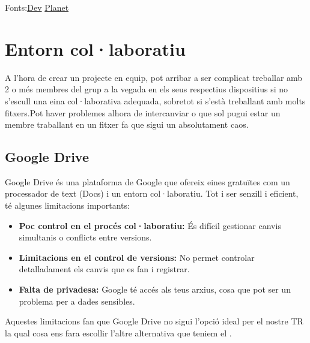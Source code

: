 Fonts:\href{https://dev.to/xploitcore/kde-vs-gnome-vs-others-choosing-the-best-linux-desktop-environment-in-2025-ab5}{Dev} \href{https://planet.communia.org/index.php/en/node/77}{Planet}



\section{Entorn col·laboratiu}\label{sec:4.3}
A l'hora de crear un projecte en equip, pot arribar a ser complicat treballar amb 2 o més membres del grup a la vegada en els seus respectius dispositius si no s'escull una eina col·laborativa adequada, sobretot si s'està treballant amb molts fitxers.Pot haver problemes alhora de intercanviar o que sol pugui estar un membre traballant en un fitxer fa que sigui un absolutament caos.
\subsection{Google Drive}
Google Drive és una plataforma de Google que ofereix eines gratuïtes com un processador de text (Docs) i un entorn col·laboratiu. Tot i ser senzill i eficient, té algunes limitacions importants:
\begin{itemize}
 \item \textbf{Poc control en el procés col·laboratiu:} És difícil gestionar canvis simultanis o conflicts entre versions.
 \item \textbf{Limitacions en el control de versions:} No permet controlar detalladament els canvis que es fan i registrar.
 \item \textbf{Falta de privadesa:} Google té accés als teus arxius, cosa que pot ser un problema per a dades sensibles.
\end{itemize}
Aquestes limitacions fan que Google Drive no sigui l'opció ideal per el nostre TR la qual cosa ens fara escollir l'altre alternativa que teniem el .
